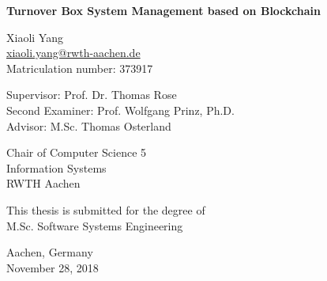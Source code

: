 \begin{titlepage}
    \begin{center}
        \vspace*{1cm}
        
        \huge
        \textbf{Turnover Box System Management based on Blockchain}
        
        \vspace{2cm}
        
        \large
        Xiaoli Yang \\
        \href{mailto:xiaoli.yang@rwth-aachen.de}{xiaoli.yang@rwth-aachen.de} \\
        Matriculation number: 373917

        \vspace{1cm}

        Supervisor: Prof. Dr. Thomas Rose \\
        Second Examiner: Prof. Wolfgang Prinz, Ph.D.\\
        Advisor: M.Sc. Thomas Osterland \\

        \vspace{1.5cm}

        Chair of Computer Science 5 \\
        Information Systems \\
        RWTH Aachen
        
        \vfill
        
        This thesis is submitted for the degree of \\
        M.Sc. Software Systems Engineering
        
        \vspace{3cm}
        
        Aachen, Germany \\
        November 28, 2018
        
        
    \end{center}
\end{titlepage}